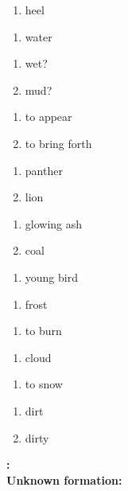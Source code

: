 \begin{enumerate}
\item heel
\end{enumerate}
\begin{enumerate}
\item water
\end{enumerate}
\begin{enumerate}
\item wet?
\item mud?
\end{enumerate}
\begin{enumerate}
\item to appear
\item to bring forth
\end{enumerate}
\begin{enumerate}
\item panther
\item lion
\end{enumerate}
\begin{enumerate}
\item glowing ash
\item coal
\end{enumerate}
\begin{enumerate}
\item young bird
\end{enumerate}
\begin{enumerate}
\item frost
\end{enumerate}
\begin{enumerate}
\item to burn
\end{enumerate}
\begin{enumerate}
\item cloud
\end{enumerate}
\begin{enumerate}
\item to snow
\end{enumerate}
\begin{enumerate}
\item dirt
\item dirty
\end{enumerate}
\noindent\textbf{:}\\
{
{
}
}\noindent\textbf{Unknown formation:}\\

